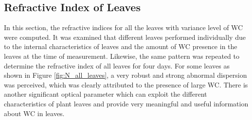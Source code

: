 \documentclass[journal,article,submit,moreauthors,pdftex]{Definitions/mdpi}
\renewcommand{\^}{\hat}  %
\begin{document}
\subsection{Refractive Index of Leaves}
In this section, the refractive indices for all the leaves with variance level of WC were computed. It was examined that different leaves performed individually due to the internal characteristics of leaves and the amount of WC presence in the leaves at the time of measurement. Likewise, the same pattern was repeated to determine the refractive index of all leaves for four days. For some leaves as shown in Figure \ref{fig:N_all_leaves}, a very robust and strong abnormal dispersion was perceived, which was clearly attributed to the presence of large WC. %
There is another significant optical parameter which can exploit the different characteristics of plant leaves and provide very meaningful and useful information about WC in leaves.
\end{document}
